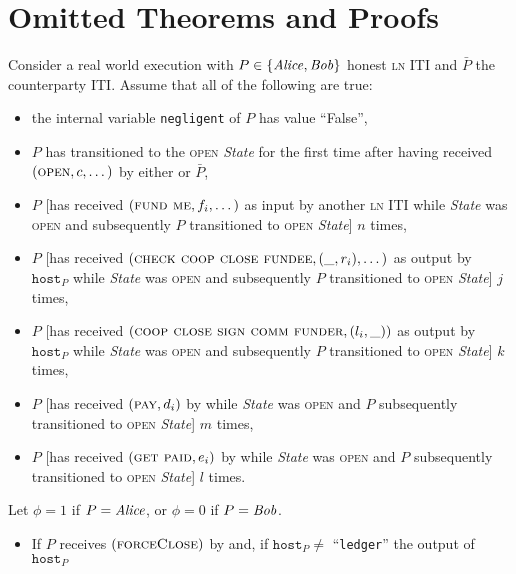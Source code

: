 \section{Omitted Theorems and Proofs}
\label{sec:proofs}

\begin{lemma}
\label{lemma:real-balance-security}
  Consider a real world execution with $P \in \{\mathit{Alice}, \mathit{Bob}\}$ honest
  \textsc{ln} ITI and $\bar{P}$ the counterparty ITI. Assume that all of the
  following are true:
  \begin{itemize}
    \item the internal variable \texttt{negligent} of $P$ has value ``False'',
    \item $P$ has transitioned to the \textsc{open} \textit{State} for the first
    time after having received $(\textsc{open}, c, \dots)$ by either
    \environment or $\bar{P}$,
    \item $P$ [has received $(\textsc{fund me}, f_i, \dots)$ as input by another
    \textsc{ln} ITI while \textit{State} was \textsc{open} and subsequently $P$
    transitioned to \textsc{open} \textit{State}] $n$ times,
    \item $P$ [has received $(\textsc{check coop close fundee}, (\_, r_i),
    \dots)$ as output by $\texttt{host}_P$ while \textit{State} was
    \textsc{open} and subsequently $P$ transitioned to \textsc{open}
    \textit{State}] $j$ times,
    \item $P$ [has received $(\textsc{coop close sign comm funder}, (l_i, \_))$
    as output by $\texttt{host}_P$ while \textit{State} was \textsc{open} and
    subsequently $P$ transitioned to \textsc{open} \textit{State}] $k$ times,
    \item $P$ [has received $(\textsc{pay}, d_i)$ by \environment while
    \textit{State} was \textsc{open} and $P$ subsequently transitioned to
    \textsc{open} \textit{State}] $m$ times,
    \item $P$ [has received $(\textsc{get paid}, e_i)$ by \environment while
    \textit{State} was \textsc{open} and $P$ subsequently transitioned to
    \textsc{open} \textit{State}] $l$ times.
  \end{itemize}
  Let $\phi = 1$ if $P = \mathit{Alice}$, or $\phi = 0$ if $P = \mathit{Bob}$.
  \begin{itemize}
    \item If $P$ receives $(\textsc{forceClose})$ by \environment and, if
    $\texttt{host}_P \neq$ ``\texttt{ledger}'' the output of $\texttt{host}_P$

\end{itemize}
\end{lemma}
